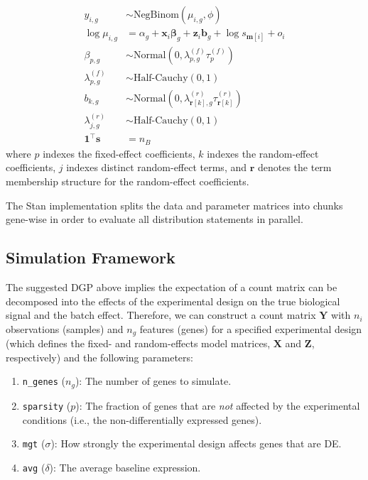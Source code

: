 \documentclass[10pt,letterpaper]{article}
\begin{document}
\begin{subequations}
    \begin{align}
        y_{i,g} &\sim \text{NegBinom}(\mu_{i,g}, \phi) \\
        \log \mu_{i,g} &= \alpha_g + \boldsymbol{x}_i \boldsymbol{\beta}_g + \boldsymbol{z}_i \boldsymbol{b}_g + \log s_{\boldsymbol{m}[i]} + o_i \\
        \beta_{p,g} &\sim \text{Normal}(0, \lambda_{p,g}^{(f)} \tau_{p}^{(f)}) \\
        \lambda_{p,g}^{(f)} &\sim \text{Half-Cauchy}(0, 1) \\
        b_{k,g} &\sim \text{Normal}(0, \lambda_{\boldsymbol{r}[k], g}^{(r)} \tau_{\boldsymbol{r}[k]}^{(r)}) \\
        \lambda_{j, g}^{(r)} &\sim \text{Half-Cauchy}(0, 1) \\
        \boldsymbol{1}^\top \boldsymbol{s} &= n_B
    \end{align}
    \label{model}
\end{subequations}
where $p$ indexes the fixed-effect coefficients, $k$ indexes the random-effect coefficients, $j$ indexes distinct random-effect terms, and $\boldsymbol{r}$ denotes the term membership structure for the random-effect coefficients.

The Stan implementation splits the data and parameter matrices into chunks gene-wise in order to evaluate all distribution statements in parallel.

\subsection*{Simulation Framework}

The suggested DGP above implies the expectation of a count matrix can be decomposed into the effects of the experimental design on the true biological signal and the batch effect.
Therefore, we can construct a count matrix $\boldsymbol{Y}$ with $n_i$ observations (samples) and $n_g$ features (genes) for a specified experimental design (which defines the fixed- and random-effects model matrices, $\boldsymbol{X}$ and $\boldsymbol{Z}$, respectively) and the following parameters:

\begin{enumerate}
	\item \verb|n_genes| ($n_g$): The number of genes to simulate.
	\item \verb|sparsity| ($p$): The fraction of genes that are \textit{not} affected by the experimental conditions (i.e., the non-differentially expressed genes).
	\item \verb|mgt| ($\sigma$): How strongly the experimental design affects genes that are DE.
	\item \verb|avg| ($\delta$): The average baseline expression.
\end{enumerate}
\end{document}
